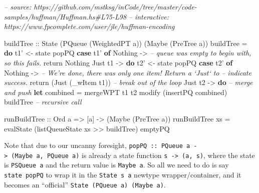 \documentclass[]{article}
\newenvironment{Shaded}{}{}
\newcommand{\CommentTok}[1]{\textcolor[rgb]{0.38,0.63,0.69}{\textit{#1}}}
\newcommand{\DataTypeTok}[1]{\textcolor[rgb]{0.56,0.13,0.00}{#1}}
\newcommand{\FunctionTok}[1]{\textcolor[rgb]{0.02,0.16,0.49}{#1}}
\newcommand{\KeywordTok}[1]{\textcolor[rgb]{0.00,0.44,0.13}{\textbf{#1}}}
\newcommand{\NormalTok}[1]{#1}
\newcommand{\OtherTok}[1]{\textcolor[rgb]{0.00,0.44,0.13}{#1}}
\begin{document}
\begin{Shaded}
\begin{Highlighting}[]
\CommentTok{-- source: https://github.com/mstksg/inCode/tree/master/code-samples/huffman/Huffman.hs#L75-L98}
\CommentTok{-- interactive: https://www.fpcomplete.com/user/jle/huffman-encoding}

\OtherTok{buildTree ::} \DataTypeTok{State}\NormalTok{ (}\DataTypeTok{PQueue}\NormalTok{ (}\DataTypeTok{WeightedPT}\NormalTok{ a)) (}\DataTypeTok{Maybe}\NormalTok{ (}\DataTypeTok{PreTree}\NormalTok{ a))}
\NormalTok{buildTree }\FunctionTok{=} \KeywordTok{do}
\NormalTok{    t1' }\OtherTok{<-}\NormalTok{ state popPQ}
    \KeywordTok{case}\NormalTok{ t1' }\KeywordTok{of}
      \DataTypeTok{Nothing} \OtherTok{->}
        \CommentTok{-- queue was empty to begin with, so this fails.}
\NormalTok{        return }\DataTypeTok{Nothing}
      \DataTypeTok{Just}\NormalTok{ t1 }\OtherTok{->} \KeywordTok{do}
\NormalTok{        t2' }\OtherTok{<-}\NormalTok{ state popPQ}
        \KeywordTok{case}\NormalTok{ t2' }\KeywordTok{of}
          \DataTypeTok{Nothing}  \OtherTok{->}
            \CommentTok{-- We're done, there was only one item!  Return a `Just` to}
            \CommentTok{-- indicate success.}
\NormalTok{            return (}\DataTypeTok{Just}\NormalTok{ (_wItem t1))     }\CommentTok{-- break out of the loop}
          \DataTypeTok{Just}\NormalTok{ t2 }\OtherTok{->} \KeywordTok{do}
            \CommentTok{-- merge and push}
            \KeywordTok{let}\NormalTok{ combined }\FunctionTok{=}\NormalTok{ mergeWPT t1 t2}
\NormalTok{            modify (insertPQ combined)}
\NormalTok{            buildTree                     }\CommentTok{-- recursive call}

\OtherTok{runBuildTree ::} \DataTypeTok{Ord}\NormalTok{ a }\OtherTok{=>}\NormalTok{ [a] }\OtherTok{->}\NormalTok{ (}\DataTypeTok{Maybe}\NormalTok{ (}\DataTypeTok{PreTree}\NormalTok{ a))}
\NormalTok{runBuildTree xs }\FunctionTok{=}\NormalTok{ evalState (listQueueState xs }\FunctionTok{>>}\NormalTok{ buildTree) emptyPQ}
\end{Highlighting}
\end{Shaded}

Note that due to our uncanny foresight,
\texttt{popPQ\ ::\ PQueue\ a\ -\textgreater{}\ (Maybe\ a,\ PQueue\ a)} is
already a state function \texttt{s\ -\textgreater{}\ (a,\ s)}, where the state
is \texttt{PSQueue\ a} and the return value is \texttt{Maybe\ a}. So all we need
to do is say \texttt{state\ popPQ} to wrap it in the \texttt{State\ s\ a}
newtype wrapper/container, and it becomes an ``official''
\texttt{State\ (PQueue\ a)\ (Maybe\ a)}.
\end{document}
